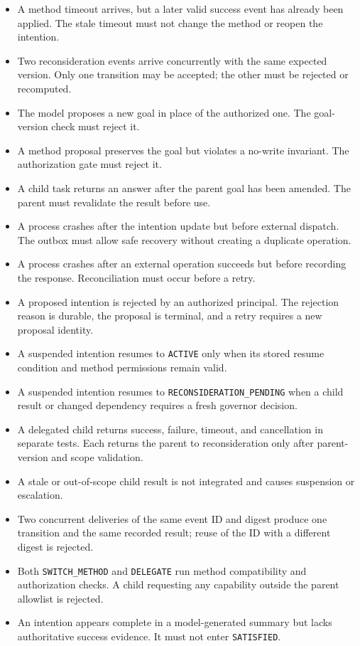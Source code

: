 \begin{itemize}
  \item A method timeout arrives, but a later valid success event has already been applied. The stale timeout must not change the method or reopen the intention.
  \item Two reconsideration events arrive concurrently with the same expected version. Only one transition may be accepted; the other must be rejected or recomputed.
  \item The model proposes a new goal in place of the authorized one. The goal-version check must reject it.
  \item A method proposal preserves the goal but violates a no-write invariant. The authorization gate must reject it.
  \item A child task returns an answer after the parent goal has been amended. The parent must revalidate the result before use.
  \item A process crashes after the intention update but before external dispatch. The outbox must allow safe recovery without creating a duplicate operation.
  \item A process crashes after an external operation succeeds but before recording the response. Reconciliation must occur before a retry.
  \item A proposed intention is rejected by an authorized principal. The rejection reason is durable, the proposal is terminal, and a retry requires a new proposal identity.
  \item A suspended intention resumes to \texttt{ACTIVE} only when its stored resume condition and method permissions remain valid.
  \item A suspended intention resumes to \texttt{RECONSIDERATION\_PENDING} when a child result or changed dependency requires a fresh governor decision.
  \item A delegated child returns success, failure, timeout, and cancellation in separate tests. Each returns the parent to reconsideration only after parent-version and scope validation.
  \item A stale or out-of-scope child result is not integrated and causes suspension or escalation.
  \item Two concurrent deliveries of the same event ID and digest produce one transition and the same recorded result; reuse of the ID with a different digest is rejected.
  \item Both \texttt{SWITCH\_METHOD} and \texttt{DELEGATE} run method compatibility and authorization checks. A child requesting any capability outside the parent allowlist is rejected.
  \item An intention appears complete in a model-generated summary but lacks authoritative success evidence. It must not enter \texttt{SATISFIED}.
\end{itemize}

